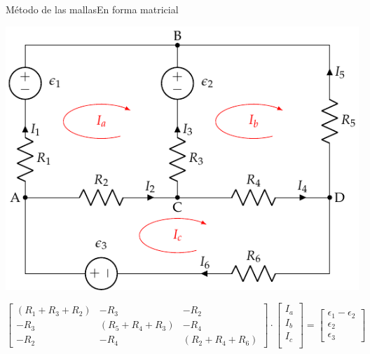 \documentclass[aspectratio=169, xcolor={usenames,svgnames,dvipsnames}]{beamer}
\begin{document}
\begin{frame}{Método de las mallas}{En forma matricial}
\begin{center}
\includegraphics[height=0.5\textheight]{../figs/mallas1_corrientes.pdf}
\end{center}
\begin{equation*}
  \begin{bmatrix}
    (R_1 + R_3 + R_2) &  - R_3 & - R_2 \\
    - R_3 & (R_5 + R_4 + R_3) & - R_4 \\
    - R_2 & - R_4 &  (R_2 + R_4 + R_6)
  \end{bmatrix} \cdot %
  \begin{bmatrix}
    I_a\\
    I_b\\
    I_c\\
  \end{bmatrix} = %
  \begin{bmatrix}
    \epsilon_1 - \epsilon_2\\
    \epsilon_2\\
    \epsilon_3
  \end{bmatrix}
\end{equation*}
\end{frame}
\end{document}
